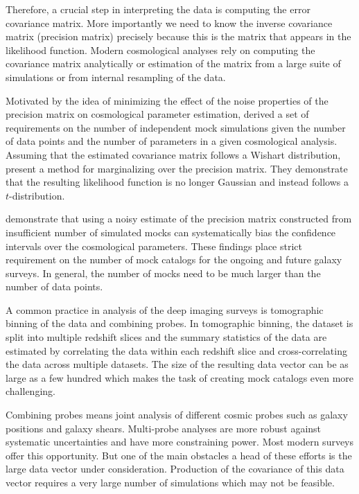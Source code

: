 Therefore, a crucial step in interpreting the data is computing the error covariance matrix. 
More importantly we need to know the inverse covariance matrix (precision matrix) precisely because this 
is the matrix that appears in the likelihood function. Modern cosmological analyses rely on computing the covariance matrix 
analytically or estimation of the matrix from a large suite of simulations or from internal resampling of the data. 

Motivated by the idea of minimizing the effect of the noise properties of the precision matrix on 
cosmological parameter estimation, \citet{dodelson2013,taylor2013,taylor2014} derived a set of requirements 
on the number of independent mock simulations given the number of data points and the number of parameters 
in a given cosmological analysis. Assuming that the estimated covariance matrix follows a Wishart distribution, 
\citep{Sellentin:2016a} present a method for marginalizing over the precision matrix. They demonstrate that the 
resulting likelihood function is no longer Gaussian and instead follows a $t$-distribution.

\citet{dodelson2013,Sellentin:2017a} demonstrate that using a noisy estimate of the precision matrix 
constructed from insufficient number of simulated mocks can systematically bias the confidence 
intervals over the cosmological parameters. These findings place strict requirement on the number of 
mock catalogs for the ongoing and future galaxy surveys. In general, the number of mocks need to be much larger than 
the number of data points.

A common practice in analysis of the deep imaging surveys is tomographic binning of the data and combining probes.
In tomographic binning, the dataset is split into multiple redshift slices and the summary statistics of 
the data are estimated by correlating the data within each redshift slice and cross-correlating the data across 
multiple datasets. The size of the resulting data vector can be as large as a few hundred which makes the task of 
creating mock catalogs even more challenging. 

Combining probes means joint analysis of different cosmic probes such as galaxy 
positions and galaxy shears. Multi-probe analyses are more robust against systematic 
uncertainties and have more constraining power. Most modern surveys offer this opportunity. 
But one of the main obstacles a head of these efforts is the large data vector under consideration. 
Production of the covariance of this data vector requires a very large number of simulations which may not 
be feasible.   

